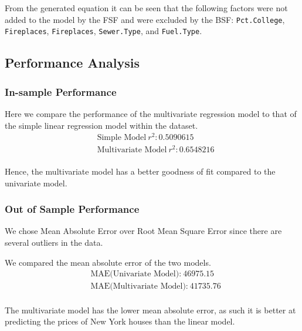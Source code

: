 \documentclass[letterpaper,9pt,twocolumn,twoside,]{pinp}
\begin{document}
From the generated equation it can be seen that the following factors
were not added to the model by the FSF and were excluded by the BSF:
\texttt{Pct.College}, \texttt{Fireplaces}, \texttt{Fireplaces},
\texttt{Sewer.Type}, and \texttt{Fuel.Type}.

\hypertarget{performance-analysis}{%
\subsection{Performance Analysis}\label{performance-analysis}}

\hypertarget{in-sample-performance}{%
\subsubsection{In-sample Performance}\label{in-sample-performance}}

Here we compare the performance of the multivariate regression model to
that of the simple linear regression model within the dataset.
\begin{equation}
  \begin{aligned}
&\text{Simple Model}\ r^2: 0.5090615\\
&\text{Multivariate Model}\ r^2: 0.6548216
       \label{eqn:example}
  \end{aligned}
\end{equation}\\
Hence, the multivariate model has a better goodness of fit compared to
the univariate model.

\hypertarget{out-of-sample-performance}{%
\subsubsection{Out of Sample
Performance}\label{out-of-sample-performance}}

We chose Mean Absolute Error over Root Mean Square Error since there are
several outliers in the data.

We compared the mean absolute error of the two models.\\
\begin{equation}
  \begin{aligned}
&\text{MAE(Univariate Model):}\ 46975.15\\  
&\text{MAE(Multivariate Model):}\ 41735.76  
       \label{eqn:example}
  \end{aligned}
\end{equation}\\
The multivariate model has the lower mean absolute error, as such it is
better at predicting the prices of New York houses than the linear
model.
\end{document}
